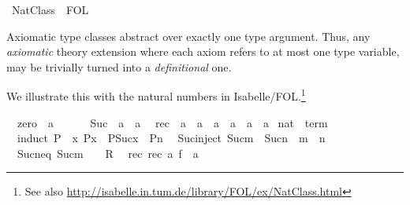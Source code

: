 %
\begin{isabellebody}%
\def\isabellecontext{NatClass}%
%
\ NatClass\ {\isacharequal}\ FOL{\isacharcolon}%
\begin{isamarkuptext}%
\medskip\noindent Axiomatic type classes abstract over exactly one
 type argument. Thus, any \emph{axiomatic} theory extension where each
 axiom refers to at most one type variable, may be trivially turned
 into a \emph{definitional} one.

 We illustrate this with the natural numbers in
 Isabelle/FOL.\footnote{See also
 \url{http://isabelle.in.tum.de/library/FOL/ex/NatClass.html}}%
\end{isamarkuptext}%
\isanewline
\ \ zero\ {\isacharcolon}{\isacharcolon}\ {\isacharprime}a\ \ \ \ {\isacharparenleft}{\isachardoublequote}{\isasymzero}{\isachardoublequote}{\isacharparenright}\isanewline
\ \ Suc\ {\isacharcolon}{\isacharcolon}\ {\isachardoublequote}{\isacharprime}a\ {\isasymRightarrow}\ {\isacharprime}a{\isachardoublequote}\isanewline
\ \ rec\ {\isacharcolon}{\isacharcolon}\ {\isachardoublequote}{\isacharprime}a\ {\isasymRightarrow}\ {\isacharprime}a\ {\isasymRightarrow}\ {\isacharparenleft}{\isacharprime}a\ {\isasymRightarrow}\ {\isacharprime}a\ {\isasymRightarrow}\ {\isacharprime}a{\isacharparenright}\ {\isasymRightarrow}\ {\isacharprime}a{\isachardoublequote}\isanewline
\isanewline
{}\ nat\ {\isasymsubseteq}\ {\isachardoublequote}term{\isachardoublequote}\isanewline
\ \ induct{\isacharcolon}\ {\isachardoublequote}P{\isacharparenleft}{\isasymzero}{\isacharparenright}\ {\isasymLongrightarrow}\ {\isacharparenleft}{\isasymAnd}x{\isachardot}\ P{\isacharparenleft}x{\isacharparenright}\ {\isasymLongrightarrow}\ P{\isacharparenleft}Suc{\isacharparenleft}x{\isacharparenright}{\isacharparenright}{\isacharparenright}\ {\isasymLongrightarrow}\ P{\isacharparenleft}n{\isacharparenright}{\isachardoublequote}\isanewline
\ \ Suc{\isacharunderscore}inject{\isacharcolon}\ {\isachardoublequote}Suc{\isacharparenleft}m{\isacharparenright}\ {\isacharequal}\ Suc{\isacharparenleft}n{\isacharparenright}\ {\isasymLongrightarrow}\ m\ {\isacharequal}\ n{\isachardoublequote}\isanewline
\ \ Suc{\isacharunderscore}neq{\isacharunderscore}{}{\isacharcolon}\ {\isachardoublequote}Suc{\isacharparenleft}m{\isacharparenright}\ {\isacharequal}\ {\isasymzero}\ {\isasymLongrightarrow}\ R{\isachardoublequote}\isanewline
\ \ rec{\isacharunderscore}{}{\isacharcolon}\ {\isachardoublequote}rec{\isacharparenleft}{\isasymzero}{\isacharcomma}\ a{\isacharcomma}\ f{\isacharparenright}\ {\isacharequal}\ a{\isachardoublequote}\isanewline

\end{isabellebody}
